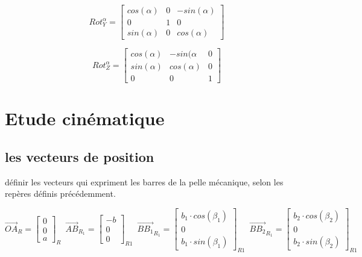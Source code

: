 \documentclass[12pt,a4paper]{article}
\begin{document}
\begin{equation}
Rot_Y^{\alpha}=
\begin{bmatrix}
cos(\alpha) & 0 & -sin(\alpha)\\
0 & 1 & 0\\
sin(\alpha) & 0 & cos(\alpha)
\end{bmatrix}
\end{equation}

\begin{equation}
Rot_Z^{\alpha}=
\begin{bmatrix}
cos(\alpha) & -sin(\alpha & 0\\
sin(\alpha) & cos(\alpha) & 0\\
0 & 0 & 1
\end{bmatrix}
\end{equation}
\newpage
\section{Etude cinématique}


\subsection{les vecteurs de position}

définir les vecteurs qui expriment les barres de la pelle mécanique, selon les repères définis précédemment. 

\begin{equation}
\vec{OA}_R=
\begin{bmatrix}
0 \\
0\\
a
\end{bmatrix}_{R} \enspace
\vec{AB}_{R_{1}}=
\begin{bmatrix}
-b \\
0\\
0
\end{bmatrix}_{R1} \enspace
\vec{B B_1}_{R_{1}}=
\begin{bmatrix}
b_1\cdot cos(\beta_1) \\
0\\
b_1\cdot sin(\beta_1)
\end{bmatrix}_{R1} \enspace
\vec{B B_2}_{R_{1}}=
\begin{bmatrix}
b_2\cdot cos(\beta_2) \\
0\\
b_2\cdot sin(\beta_2)
\end{bmatrix}_{R1} \enspace
\end{equation}
\end{document}
